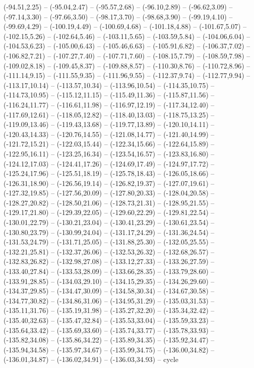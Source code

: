 {  (-94.51,2.25) -- (-95.04,2.47) -- (-95.57,2.68) -- (-96.10,2.89) -- (-96.62,3.09) -- (-97.14,3.30) -- (-97.66,3.50) --
  (-98.17,3.70) -- (-98.68,3.90) -- (-99.19,4.10) -- (-99.69,4.29) -- (-100.19,4.49) -- (-100.69,4.68) -- (-101.18,4.88) --
  (-101.67,5.07) -- (-102.15,5.26) -- (-102.64,5.46) -- (-103.11,5.65) -- (-103.59,5.84) -- (-104.06,6.04) -- (-104.53,6.23) --
  (-105.00,6.43) -- (-105.46,6.63) -- (-105.91,6.82) -- (-106.37,7.02) -- (-106.82,7.21) -- (-107.27,7.40) -- (-107.71,7.60) --
  (-108.15,7.79) -- (-108.59,7.98) -- (-109.02,8.18) -- (-109.45,8.37) -- (-109.88,8.57) -- (-110.30,8.76) -- (-110.72,8.96) --
  (-111.14,9.15) -- (-111.55,9.35) -- (-111.96,9.55) -- (-112.37,9.74) -- (-112.77,9.94) -- (-113.17,10.14) -- (-113.57,10.34) --
  (-113.96,10.54) -- (-114.35,10.75) -- (-114.73,10.95) -- (-115.12,11.15) -- (-115.49,11.36) -- (-115.87,11.56) -- (-116.24,11.77) --
  (-116.61,11.98) -- (-116.97,12.19) -- (-117.34,12.40) -- (-117.69,12.61) -- (-118.05,12.82) -- (-118.40,13.03) -- (-118.75,13.25) --
  (-119.09,13.46) -- (-119.43,13.68) -- (-119.77,13.89) -- (-120.10,14.11) -- (-120.43,14.33) -- (-120.76,14.55) -- (-121.08,14.77) --
  (-121.40,14.99) -- (-121.72,15.21) -- (-122.03,15.44) -- (-122.34,15.66) -- (-122.64,15.89) -- (-122.95,16.11) -- (-123.25,16.34) --
  (-123.54,16.57) -- (-123.83,16.80) -- (-124.12,17.03) -- (-124.41,17.26) -- (-124.69,17.49) -- (-124.97,17.72) -- (-125.24,17.96) --
  (-125.51,18.19) -- (-125.78,18.43) -- (-126.05,18.66) -- (-126.31,18.90) -- (-126.56,19.14) -- (-126.82,19.37) -- (-127.07,19.61) --
  (-127.32,19.85) -- (-127.56,20.09) -- (-127.80,20.33) -- (-128.04,20.58) -- (-128.27,20.82) -- (-128.50,21.06) -- (-128.73,21.31) --
  (-128.95,21.55) -- (-129.17,21.80) -- (-129.39,22.05) -- (-129.60,22.29) -- (-129.81,22.54) -- (-130.01,22.79) -- (-130.21,23.04) --
  (-130.41,23.29) -- (-130.61,23.54) -- (-130.80,23.79) -- (-130.99,24.04) -- (-131.17,24.29) -- (-131.36,24.54) -- (-131.53,24.79) --
  (-131.71,25.05) -- (-131.88,25.30) -- (-132.05,25.55) -- (-132.21,25.81) -- (-132.37,26.06) -- (-132.53,26.32) -- (-132.68,26.57) --
  (-132.83,26.82) -- (-132.98,27.08) -- (-133.12,27.33) -- (-133.26,27.59) -- (-133.40,27.84) -- (-133.53,28.09) -- (-133.66,28.35) --
  (-133.79,28.60) -- (-133.91,28.85) -- (-134.03,29.10) -- (-134.15,29.35) -- (-134.26,29.60) -- (-134.37,29.85) -- (-134.47,30.09) --
  (-134.58,30.34) -- (-134.67,30.58) -- (-134.77,30.82) -- (-134.86,31.06) -- (-134.95,31.29) -- (-135.03,31.53) -- (-135.11,31.76) --
  (-135.19,31.98) -- (-135.27,32.20) -- (-135.34,32.42) -- (-135.40,32.63) -- (-135.47,32.84) -- (-135.53,33.04) -- (-135.59,33.23) --
  (-135.64,33.42) -- (-135.69,33.60) -- (-135.74,33.77) -- (-135.78,33.93) -- (-135.82,34.08) -- (-135.86,34.22) -- (-135.89,34.35) --
  (-135.92,34.47) -- (-135.94,34.58) -- (-135.97,34.67) -- (-135.99,34.75) -- (-136.00,34.82) -- (-136.01,34.87) -- (-136.02,34.91) --
  (-136.03,34.93) -- cycle}
\def\EQ{(-20.09,6.64)}
\def\EX{(-31.56,9.44)}
\def\EY{(-20.09,-6.48)}
\def\EZ{(-12.06,10.64)}
\def\EXY{(-31.56,-3.68)}
\def\EXZ{(-23.53,13.44)}
\def\EYZ{(-12.06,-2.49)}
\def\Dtriad{(-114.03,-35.23)}
